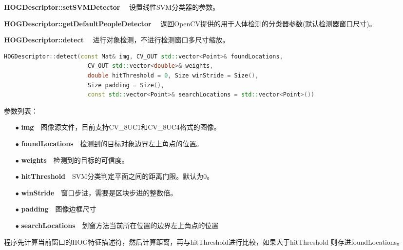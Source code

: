 \textbf{HOGDescriptor::setSVMDetector}~~
设置线性SVM分类器的参数。

\textbf{HOGDescriptor::getDefaultPeopleDetector}~~
返回OpenCV提供的用于人体检测的分类器参数(默认检测器窗口尺寸)。

\textbf{HOGDescriptor::detect}~~
进行对象检测，不进行检测窗口多尺寸缩放。
\begin{lstlisting}[language=C++]
HOGDescriptor::detect(const Mat& img, CV_OUT std::vector<Point>& foundLocations,
                        CV_OUT std::vector<double>& weights,
                        double hitThreshold = 0, Size winStride = Size(),
                        Size padding = Size(),
                        const std::vector<Point>& searchLocations = std::vector<Point>())
\end{lstlisting}
参数列表：
\begin{enumerate}
\item[$\bullet$]\textbf{img}~~图像源文件，目前支持\textsf{CV\_8UC1}和\textsf{CV\_8UC4}格式的图像。
\item[$\bullet$]\textbf{foundLocations}~~检测到的目标对象边界左上角点的位置。
\item[$\bullet$]\textbf{weights}~~检测到的目标的可信度。
\item[$\bullet$]\textbf{hitThreshold}~~SVM分类判定平面之间的距离门限。默认为0。
\item[$\bullet$]\textbf{winStride}~~窗口步进，需要是区块步进的整数倍。
\item[$\bullet$]\textbf{padding}~~图像边框尺寸
\item[$\bullet$]\textbf{searchLocations}~~划窗方法当前所在位置的边界左上角点的位置
\end{enumerate}
程序先计算当前窗口的HOG特征描述符，然后计算距离，再与\textsf{hitThreshold}进行比较，如果大于\textsf{hitThreshold}
则存进\textsf{foundLocations}。

